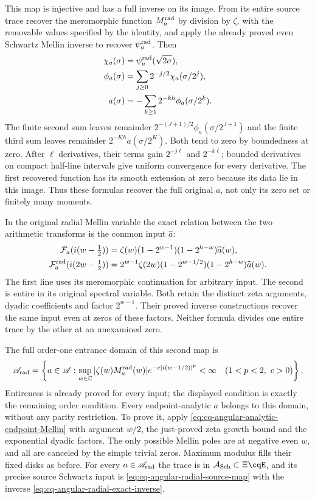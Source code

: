 This map is injective and has a full inverse on its image.
From its entire source trace recover the meromorphic function
$M_a^{\rm rad}$ by division by $\zeta$, with the removable values
specified by the identity, and apply the already proved even
Schwartz Mellin inverse to recover $\psi_a^{\rm rad}$.
Then
\begin{align}
 \chi_a(\sigma)&=\psi_a^{\rm rad}(\sqrt{2\sigma}),\notag\\
 \phi_a(\sigma)&=\sum_{j\geq0}2^{-j/2}\chi_a(\sigma/2^j),\notag\\
 a(\sigma)&=-\sum_{k\geq1}2^{-kh}\phi_a(\sigma/2^k).
 \label{eq:cq-angular-radial-exact-inverse}
\end{align}
The finite second sum leaves remainder
$2^{-(J+1)/2}\phi_a(\sigma/2^{J+1})$ and the finite third
sum leaves remainder $2^{-Kh}a(\sigma/2^K)$.
Both tend to zero by boundedness at zero. After $\ell$
derivatives, their terms gain $2^{-j\ell}$ and $2^{-k\ell}$;
bounded derivatives on compact half-line intervals give uniform
convergence for every derivative. The first recovered function
has its smooth extension at zero because its data lie in this
image. Thus these formulas recover the full original $a$, not
only its zero set or finitely many moments.

In the original radial Mellin variable the exact relation between
the two arithmetic transforms is the common input $\widehat a$:
\begin{align*}
 \mathcal F_a(i(w-\tfrac12))
 &=\zeta(w)(1-2^{w-1})(1-2^{h-w})\widehat a(w),\\
 \mathcal F_a^{\rm rad}(i(2w-\tfrac12))
 &=2^{w-1}\zeta(2w)(1-2^{w-1/2})(1-2^{h-w})\widehat a(w).
\end{align*}
The first line uses its meromorphic continuation for arbitrary
input. The second is entire in its original spectral variable.
Both retain the distinct zeta arguments, dyadic coefficients
and factor $2^{w-1}$. Their proved inverse constructions recover
the same input even at zeros of these factors. Neither formula
divides one entire trace by the other at an unexamined zero.

The full order-one entrance domain of this second map is
\begin{equation}
 \mathscr A_{\rm rad}=
 \left\{a\in\mathscr A:
 \sup_{w\in\mathbb C}
 |\zeta(w)M_a^{\rm rad}(w)|
 e^{-c|i(w-1/2)|^p}<\infty
       \quad(1<p<2,\ c>0)\right\}.
 \label{eq:cq-angular-radial-order-domain}
\end{equation}
Entireness is already proved for every input; the displayed
condition is exactly the remaining order condition.
Every endpoint-analytic $a$ belongs to this domain, without
any parity restriction. To prove it, apply
\eqref{eq:cq-angular-analytic-endpoint-Mellin} with argument
$w/2$, the just-proved zeta growth bound and the exponential
dyadic factors. The only possible Mellin poles are at negative
even $w$, and all are canceled by the simple trivial zeros.
Maximum modulus fills their fixed disks as before.
For every $a\in\mathscr A_{\rm rad}$ the trace is in
$\mathcal A_{\rm Sch}\subset\Xi\cqE$, and its precise source
Schwartz input is \eqref{eq:cq-angular-radial-source-map} with
the inverse \eqref{eq:cq-angular-radial-exact-inverse}.

